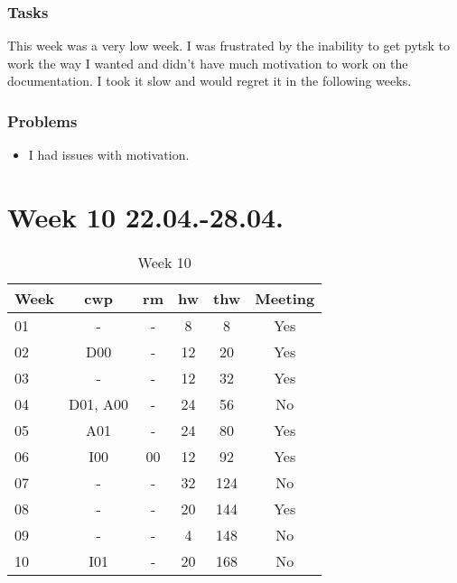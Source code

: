 \subsubsection{Tasks}

This week was a very low week. I was frustrated by the inability to get \gls{pytsk} to work the way I wanted and didn't have much motivation to work on the documentation. I took it slow and would regret it in the following weeks.

\subsubsection{Problems}

\begin{itemize}
    \item I had issues with motivation.
\end{itemize}

\section{Week 10 22.04.-28.04.}
\label{sec:journal:week10}

\begin{table}[!ht]
    \begin{center}
        \caption{Week 10}
        \label{tab:journal:week10}
        \begin{tabular}{l|c|c|c|c|c}
            \textbf{Week} & \textbf{\gls{cwp}} & \textbf{\gls{rm}} & \textbf{\gls{hw}} & \textbf{\gls{thw}} & \textbf{Meeting}\\
        \hline
        01 & - & - & 8 & 8 & Yes \\
        02 & D00 & - & 12 & 20 & Yes \\
        03 & - & - & 12 & 32 & Yes \\
        04 & D01, A00 & - & 24 & 56 & No \\
        05 & A01 & - & 24 & 80 & Yes \\
        06 & I00 & 00 & 12 & 92 & Yes \\
        07 & - & - & 32 & 124 & No \\
        08 & - & - & 20 & 144 & Yes \\
        09 & - & - & 4 & 148 & No \\
        10 & I01 & - & 20 & 168 & No \\
        \end{tabular}
    \end{center}
\end{table}

